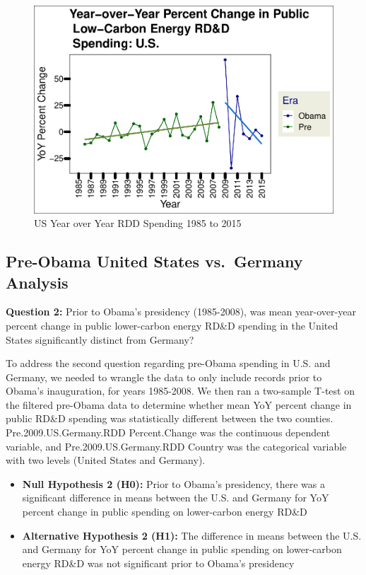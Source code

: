 \documentclass[
  12pt,
]{article}
\begin{document}
\begin{figure}
\centering
\includegraphics{Chang_Jenkins_Mullens_ENV872_Final_files/figure-latex/visualizing the US data-1.pdf}
\caption{US Year over Year RDD Spending 1985 to 2015}
\end{figure}

\hypertarget{pre-obama-united-states-vs.-germany-analysis}{%
\subsection{Pre-Obama United States vs.~Germany
Analysis}\label{pre-obama-united-states-vs.-germany-analysis}}

\textbf{Question 2:} Prior to Obama's presidency (1985-2008), was mean
year-over-year percent change in public lower-carbon energy RD\&D
spending in the United States significantly distinct from Germany?

To address the second question regarding pre-Obama spending in U.S. and
Germany, we needed to wrangle the data to only include records prior to
Obama's inauguration, for years 1985-2008. We then ran a two-sample
T-test on the filtered pre-Obama data to determine whether mean YoY
percent change in public RD\&D spending was statistically different
between the two counties. Pre.2009.US.Germany.RDD Percent.Change was the
continuous dependent variable, and Pre.2009.US.Germany.RDD Country was
the categorical variable with two levels (United States and Germany).

\begin{itemize}
\item
  \textbf{Null Hypothesis 2 (H0):} Prior to Obama's presidency, there
  was a significant difference in means between the U.S. and Germany for
  YoY percent change in public spending on lower-carbon energy RD\&D
\item
  \textbf{Alternative Hypothesis 2 (H1):} The difference in means
  between the U.S. and Germany for YoY percent change in public spending
  on lower-carbon energy RD\&D was not significant prior to Obama's
  presidency
\end{itemize}
\end{document}
